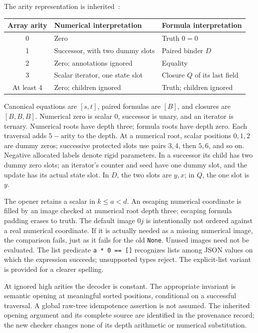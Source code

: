 \documentclass[11pt,letterpaper]{article}
\theoremstyle{definition}\newtheorem{definition}[theorem]{Definition}
\theoremstyle{remark}\newtheorem{remark}[theorem]{Remark}
\begin{document}
The arity representation is inherited~\cite{arity,certified}:
\begin{center}\small
\begin{tabular}{cll}
\toprule
Array arity & Numerical interpretation & Formula interpretation\\
\midrule
0 & Zero & Truth $0=0$\\
1 & Successor, with two dummy slots & Paired binder $D$\\
2 & Zero; annotations ignored & Equality\\
3 & Scalar iterator, one state slot & Closure $Q$ of its last field\\
At least 4 & Zero; children ignored & Truth; children ignored\\
\bottomrule
\end{tabular}
\end{center}
Canonical equations are $[s,t]$, paired formulas are $[B]$, and closures
are $[B,B,B]$. Numerical zero is scalar $0$, successor is unary, and an
iterator is ternary. Numerical roots have depth three; formula roots have
depth zero. Each traversal adds $5-\text{arity}$ to the depth. At a
numerical root, scalar positions $0,1,2$ are dummy zeros; successive
protected slots use pairs $3,4$, then $5,6$, and so on. Negative allocated
labels denote rigid parameters. In a successor its child has two dummy
zero slots; an iterator's counter and seed have one dummy slot, and the
update has its actual state slot. In $D$, the two slots are $y,x$; in
$Q$, the one slot is $y$.

The opener retains a scalar in $k\le a<d$. An escaping numerical
coordinate is filled by an image checked at numerical root depth three;
escaping formula padding erases to truth. The default image $0j$ is
intentionally not ordered against a real numerical coordinate. If it is
actually needed as a missing numerical image, the comparison fails,
just as it fails for the old \texttt{None}. Unused images need not be
evaluated. The list predicate \texttt{a * 0 == []} recognizes lists among
JSON values on which the expression succeeds; unsupported types reject.
The explicit-list variant is provided for a clearer spelling.

At ignored high arities the decoder is constant. The appropriate invariant
is semantic opening at meaningful sorted positions, conditional on a
successful traversal. A global raw-tree idempotence assertion is not
assumed. The inherited opening argument and its complete source are
identified in the provenance record; the new checker changes none of
its depth arithmetic or numerical substitution.
\end{document}
